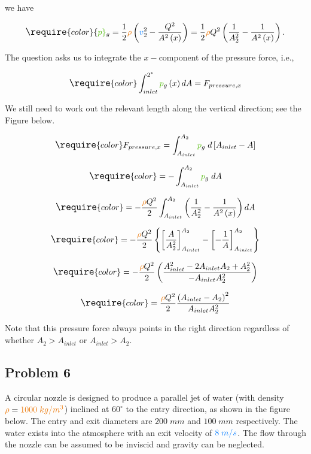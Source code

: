 \documentclass[
  1.2em,
  letterpaper,
  DIV=11,
  numbers=noendperiod]{scrartcl}
\begin{document}
we have

\[
\large
\require{color}
{\color[rgb]{0.315209,0.728565,0.037706}p}_g = \frac{1}{2}{\color[rgb]{0.918231,0.469102,0.038229}\rho} \left({\color[rgb]{0.059472,0.501943,0.998465}v}_2^2 - \frac{Q^2}{A^2\left(x\right)} \right) = \frac{1}{2}{\color[rgb]{0.918231,0.469102,0.038229}\rho} Q^2 \left(\frac{1}{A_2^2} - \frac{1}{A^2\left(x\right)} \right) .
\]

The question asks us to integrate the \(x-\)component of the pressure
force, i.e.,

\[
\large
\require{color}
\int_{inlet}^{2^{\ast}} {\color[rgb]{0.315209,0.728565,0.037706}p}_{g}\left(x\right) dA = F_{pressure,x}
\]

We still need to work out the relevant length along the vertical
direction; see the Figure below.

\[
\large
\require{color}
F_{pressure,x}  = \int_{A_{inlet}}^{A_2} {\color[rgb]{0.315209,0.728565,0.037706}p}_{g} \; d\left[A_{inlet} - A \right]
\]

\[
\large
\require{color}
= -\int_{A_{inlet}}^{A_2} {\color[rgb]{0.315209,0.728565,0.037706}p}_{g} \; dA
\]

\[
\large
\require{color}
 = -\frac{{\color[rgb]{0.918231,0.469102,0.038229}\rho} Q^2}{2} \int_{A_{inlet}}^{A_2} \left(\frac{1}{A_2^2} - \frac{1}{A^2\left(x\right)} \right)dA 
\]

\[
\large
\require{color}
=-\frac{{\color[rgb]{0.918231,0.469102,0.038229}\rho} Q^2}{2} \left\{ \left[ \frac{A}{A_2^2}\right]_{A_{inlet}}^{A_2} - \left[- \frac{1}{A}\right]_{A_{inlet}}^{A_2}\right\}
\]

\[
\large
\require{color}
= -\frac{{\color[rgb]{0.918231,0.469102,0.038229}\rho} Q^2}{2} \left( \frac{A^2_{inlet} - 2A_{inlet}A_2 + A^2_{2}}{-A_{inlet}A_2^2} \right)
\]

\[
\large
\require{color}
= \frac{{\color[rgb]{0.918231,0.469102,0.038229}\rho} Q^2}{2} \frac{\left(A_{inlet} - A_2 \right)^2}{A_{inlet}A_2^2}
\]

Note that this pressure force always points in the right direction
regardless of whether \(A_2 > A_{inlet}\) or \(A_{inlet}> A_2\).

\hypertarget{problem-6}{%
\subsection{Problem 6}\label{problem-6}}

A circular nozzle is designed to produce a parallel jet of water (with
density
\({\color[rgb]{0.918231,0.469102,0.038229}\rho} ={\color[rgb]{0.918231,0.469102,0.038229} 1000 \; kg/m^3}\))
inclined at \(60^{\circ}\) to the entry direction, as shown in the
figure below. The entry and exit diameters are \(200 \; mm\) and
\(100 \; mm\) respectively. The water exists into the atmosphere with an
exit velocity of \({\color[rgb]{0.059472,0.501943,0.998465}8 \; m/s}\).
The flow through the nozzle can be assumed to be inviscid and gravity
can be neglected.
\end{document}
